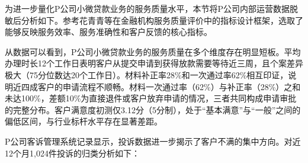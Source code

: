 为进一步量化P公司小微贷款业务的服务质量水平，本节将P公司内部运营数据脱敏后分析如下。参考花青青等\cite{ref15}在金融机构服务质量评价中的指标设计框架，选取了能够反映服务效率、服务准确性和客户反馈的核心指标。\par

\begin{table}[htbp]
  \centering
  \small
  \caption[服务质量核心指标（近12个月）]{P公司小微贷款业务服务质量核心指标（近12个月）}
\end{table}

从数据可以看到，P公司小微贷款业务的服务质量在多个维度存在明显短板。平均办理时长12个工作日表明客户从提交申请到获得放款需要等待近三周，且个案差异极大（75分位数达20个工作日）。材料补正率28\%和一次通过率62\%相互印证，说明近四成客户的申请流程不顺畅。材料一次通过率（62\%）与补正率（28\%）之和未达100\%，差额10\%为直接退件或客户放弃申请的情况，三者共同构成申请审批的完整分布。客户满意度初测仅3.12分（5分制），处于“基本满意”与“一般”之间的偏低区间，与行业标杆水平存在显著差距。\par

P公司客诉管理系统记录显示，投诉数据进一步揭示了客户不满的集中方向。对近12个月1,024件投诉的归类分析如下：\par

